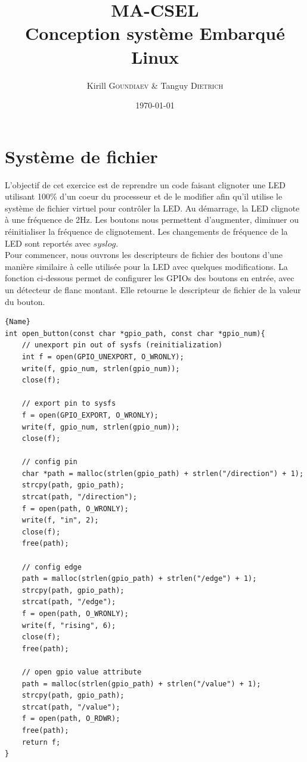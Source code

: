 \documentclass[
	a4paper, %
	10pt, %
]{CSUniSchoolLabReport}
\title{MA-CSEL \\ Conception syst\`eme Embarqué Linux } %
\author{Kirill \textsc{Goundiaev} \& Tanguy \textsc{Dietrich}} %
\date{\today} %
\begin{document}
\maketitle %

\begin{figure}[H] %
\label{fig:speciation}
\end{figure}


\newpage

\tableofcontents
\newpage


\section{Système de fichier}\label{filesystem}
L'objectif de cet exercice est de reprendre un code faisant clignoter une LED utilisant 100\% d'un coeur du processeur et de le modifier afin qu'il utilise le système de fichier virtuel pour contrôler la LED. Au démarrage, la LED clignote à une fréquence de 2Hz. Les boutons nous permettent d'augmenter, diminuer ou réinitialiser la fréquence de clignotement. Les changements de fréquence de la LED sont reportés avec $syslog$.\\
Pour commencer, nous ouvrons les descripteurs de fichier des boutons d'une manière similaire à celle utilisée pour la LED avec quelques modifications. La fonction ci-dessous permet de configurer les GPIOs des boutons en entrée, avec un détecteur de flanc montant. Elle retourne le descripteur de fichier de la valeur du bouton.\\

\begin{lstlisting}[style=CStyle, caption=Fonction d'ouverture et configuration de boutton, firstnumber=1]{Name}
int open_button(const char *gpio_path, const char *gpio_num){
	// unexport pin out of sysfs (reinitialization)
	int f = open(GPIO_UNEXPORT, O_WRONLY);
	write(f, gpio_num, strlen(gpio_num));
	close(f);

	// export pin to sysfs
	f = open(GPIO_EXPORT, O_WRONLY);
	write(f, gpio_num, strlen(gpio_num));
	close(f);

	// config pin
	char *path = malloc(strlen(gpio_path) + strlen("/direction") + 1);
	strcpy(path, gpio_path);
	strcat(path, "/direction");
	f = open(path, O_WRONLY);
	write(f, "in", 2);
	close(f);
	free(path);

	// config edge
	path = malloc(strlen(gpio_path) + strlen("/edge") + 1);
	strcpy(path, gpio_path);
	strcat(path, "/edge");
	f = open(path, O_WRONLY);
	write(f, "rising", 6);
	close(f);
	free(path);

	// open gpio value attribute
	path = malloc(strlen(gpio_path) + strlen("/value") + 1);
	strcpy(path, gpio_path);
	strcat(path, "/value");
	f = open(path, O_RDWR);
	free(path);
	return f;
}
\end{lstlisting}
\end{document}
